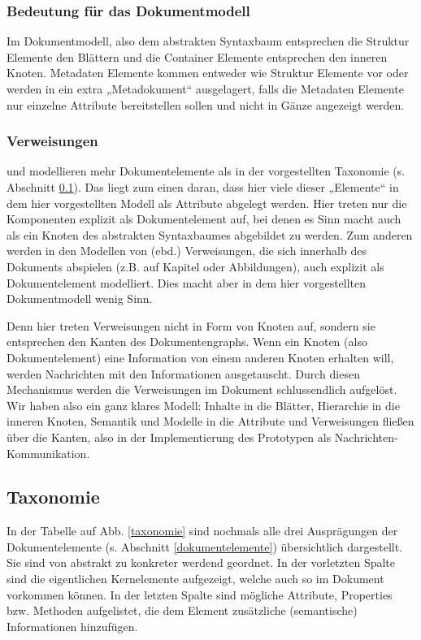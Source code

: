  
\subsubsection{Bedeutung für das Dokumentmodell}\label{}

 
Im Dokumentmodell, also dem abstrakten Syntaxbaum entsprechen die Struktur Elemente den Blättern und die Container Elemente entsprechen den inneren Knoten. Metadaten Elemente kommen entweder wie Struktur Elemente vor oder werden in ein extra „Metadokument“ ausgelagert, falls die Metadaten Elemente nur einzelne Attribute bereitstellen sollen und nicht in Gänze angezeigt werden.

 
\subsubsection{Verweisungen}\label{}

 
\citep{Peroni} und \citep{NISO} modellieren mehr Dokumentelemente als in der vorgestellten Taxonomie (s. Abschnitt \ref{taxonomiesec}). Das liegt zum einen daran, dass hier viele dieser „Elemente“ in dem hier vorgestellten Modell als Attribute abgelegt werden. Hier treten nur die Komponenten explizit als Dokumentelement auf, bei denen es Sinn macht auch als ein Knoten des abstrakten Syntaxbaumes abgebildet zu werden. Zum anderen werden in den Modellen von (ebd.) Verweisungen, die sich innerhalb des Dokuments abspielen (z.B. auf Kapitel oder Abbildungen), auch explizit als Dokumentelement modelliert. Dies macht aber in dem hier vorgestellten Dokumentmodell wenig Sinn.

 
Denn hier treten Verweisungen nicht in Form von Knoten auf, sondern sie entsprechen den Kanten des Dokumentengraphs. Wenn ein Knoten (also Dokumentelement) eine Information von einem anderen Knoten erhalten will, werden Nachrichten mit den Informationen ausgetauscht. Durch diesen Mechanismus werden die Verweisungen im Dokument schlussendlich aufgelöst. Wir haben also ein ganz klares Modell: Inhalte in die Blätter, Hierarchie in die inneren Knoten, Semantik und Modelle in die Attribute und Verweisungen fließen über die Kanten, also in der Implementierung des Prototypen als Nachrichten-Kommunikation.

 
\subsection{Taxonomie}\label{taxonomiesec}
 
In der Tabelle auf Abb. \ref{taxonomie} sind nochmals alle drei Ausprägungen der Dokumentelemente (s. Abschnitt \ref{dokumentelemente}) übersichtlich dargestellt. Sie sind von abstrakt zu konkreter werdend geordnet. In der vorletzten Spalte sind die eigentlichen Kernelemente aufgezeigt, welche auch so im Dokument vorkommen können. In der letzten Spalte sind mögliche Attribute, Properties bzw. Methoden aufgelistet, die dem Element zusätzliche (semantische) Informationen hinzufügen.

